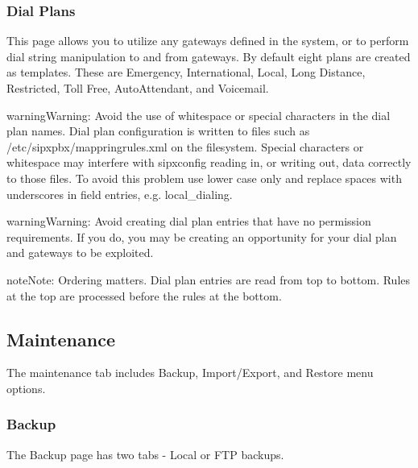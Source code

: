 \documentclass[letterpaper,10pt,english]{sphinxmanual}
\begin{document}
\subsubsection{Dial Plans}
\label{\detokenize{webui:dial-plans}}\label{\detokenize{webui:id20}}
This page allows you to utilize any gateways defined in the system, or to perform dial string manipulation to and from gateways. By default eight plans are created as templates. These are Emergency, International, Local, Long Distance, Restricted, Toll Free, AutoAttendant, and Voicemail.

\begin{sphinxadmonition}{warning}{Warning:}
Avoid the use of whitespace or special characters in the dial plan names. Dial plan configuration is written to files such as /etc/sipxpbx/mappringrules.xml on the filesystem. Special characters or whitespace may interfere with sipxconfig reading in, or writing out, data correctly to those files. To avoid this problem use lower case only and replace spaces with underscores in field entries, e.g. local\_dialing.
\end{sphinxadmonition}

\begin{sphinxadmonition}{warning}{Warning:}
Avoid creating dial plan entries that have no permission requirements. If you do, you may be creating an opportunity for your dial plan and gateways to be exploited.
\end{sphinxadmonition}

\begin{sphinxadmonition}{note}{Note:}
Ordering matters. Dial plan entries are read from top to bottom. Rules at the top are processed before the rules at the bottom.
\end{sphinxadmonition}



\subsection{Maintenance}
\label{\detokenize{webui:maintenance}}\label{\detokenize{webui:maintenance-tab}}
The maintenance tab includes Backup, Import/Export, and Restore menu options.


\subsubsection{Backup}
\label{\detokenize{webui:backup}}\label{\detokenize{webui:id21}}
The Backup page has two tabs - Local or FTP backups.
\end{document}
